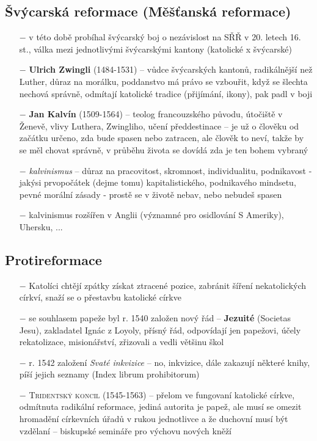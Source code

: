 \documentclass{article}
\begin{document}
\subsection*{Švýcarská reformace (Měšťanská reformace)}
\begin{itemize}
  \item[$-$] v této době probíhal švýcarský boj o nezávislost na SŘŘ v 20. letech 16. st., válka mezi jednotlivými švýcarskými kantony (katolické x švýcarské)
  \item[$-$] \textbf{Ulrich Zwingli} (1484-1531) -- vůdce švýcarských kantonů, radikálnější než Luther, důraz na morálku, poddanstvo má právo se vzbouřit, když se šlechta nechová správně, odmítají katolické tradice (přijímání, ikony), pak padl v boji
  \item[$-$] \textbf{Jan Kalvín} (1509-1564) -- teolog francouzského původu, útočiště v Ženevě, vlivy Luthera, Zwingliho, učení předdestinace -- je už o člověku od začátku určeno, zda bude spasen nebo zatracen, ale člověk to neví, takže by se měl chovat správně, v průběhu života se dovídá zda je ten bohem vybraný
  \item[$-$] \textit{kalvinismus} -- důraz na pracovitost, skromnost, individualitu, podnikavost - jakýsi prvopočátek (dejme tomu) kapitalistického, podnikavého mindsetu, pevné morální zásady - prostě se v životě nebav, nebo nebudeš spasen
  \item[$-$] kalvinismus rozšířen v Anglii (významné pro osidlování S Ameriky), Uhersku, ...
\end{itemize}

\subsection*{Protireformace}
\begin{itemize}
  \item[$-$] Katolíci chtějí zpátky získat ztracené pozice, zabránit šíření nekatolických církví, snaží se o přestavbu katolické církve
  \item[$-$] se souhlasem papeže byl r. 1540 založen nový řád -- \textbf{Jezuité} (Societas Jesu), zakladatel Ignác z Loyoly, přísný řád, odpovídají jen papežovi, účely rekatolizace, misionářství, zřizovali a vedli většinu škol
  \item[$-$] r. 1542 založení \textit{Svaté inkvizice} -- no, inkvizice, dále zakazují některé knihy, píší jejich seznamy (Index librum prohibitorum)
  \item[$-$] \textsc{Tridentský koncil} (1545-1563) -- přelom ve fungovaní katolické církve, odmítnuta radikální reformace, jediná autorita je papež, ale musí se omezit hromadění církevních úřadů v rukou jednotlivce a že duchovní musí být vzdělaní -- biskupské semináře pro výchovu nových kněží
\end{itemize}
\end{document}
